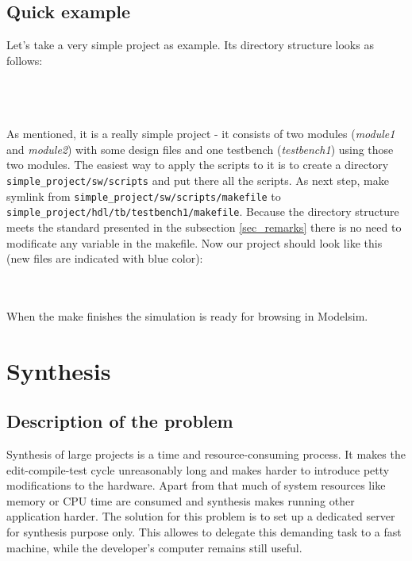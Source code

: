 \documentclass[a4paper,10pt]{article}
\begin{document}
\subsection{Quick example}
Let's take a very simple project as example. Its directory structure looks as follows: \\
\\
\begin{minipage}{\linewidth}
\small{
\nopagebreak
{}
}
\normalsize
\end{minipage}
\\\\
As mentioned, it is a really simple project - it consists of two modules (\textit{module1} and \textit{module2}) with some design files and one testbench (\textit{testbench1}) using those two modules.
The easiest way to apply the scripts to it is to create a directory \verb!simple_project/sw/scripts! and put there all the scripts. As next step, make symlink from \verb!simple_project/sw/scripts/makefile! to \verb!simple_project/hdl/tb/testbench1/makefile!. Because the directory structure meets the standard presented in the subsection \ref{sec_remarks} there is no need to modificate any variable in the makefile. Now our project should look like this (new files are indicated with blue color):\\
\begin{minipage}{\linewidth}
\small{
}
\end{minipage}
\normalsize
\\\\
When the make finishes the simulation is ready for browsing in Modelsim.
\section{Synthesis}
\subsection{Description of the problem}
Synthesis of large projects is a time and resource-consuming process. It makes the edit-compile-test cycle unreasonably long and makes harder to introduce petty modifications to the hardware. Apart from that much of system resources like memory or CPU time are consumed and synthesis makes running other application harder. The solution for this problem is to set up a dedicated server for synthesis purpose only. This allowes to delegate this demanding task to a fast machine, while the developer's computer remains still useful.
\end{document}
